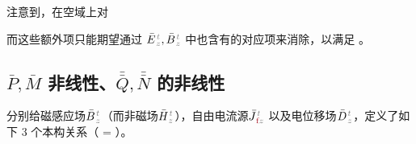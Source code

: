 注意到，在空域上对 

而这些额外项只能期望通过 $\bar{E}^{\;\!\mathcolor{gray}{t}}_{\;\!\mathcolor{gray}{z}},\bar{B}^{\;\!\mathcolor{gray}{t}}_{\;\!\mathcolor{gray}{z}}$ 中也含有的对应项来消除，以满足 。




\subsection{$\bar{P},\bar{M}$ 非线性、$\bar{\bar{Q}},\bar{\bar{N}}$ 的非线性}\label{ssec:PMQN-nonlinear}

分别给磁感应场$\bar{B}^{\;\!\mathcolor{gray}{t}}_{\;\!\mathcolor{gray}{z}}$（而非磁场$\bar{H}^{\;\!\mathcolor{gray}{t}}_{\;\!\mathcolor{gray}{z}}$），自由电流源$\bar{J}^{\;\!\mathcolor{gray}{t}}_{\;\!\textcolor{Maroon}{\text{f}}\mathcolor{gray}{z}}$ 以及电位移场$\bar{D}^{\;\!\mathcolor{gray}{t}}_{\;\!\mathcolor{gray}{z}}$，定义了如下 3 个本构关系（\textcolor{Maroon}{} = \textcolor{Maroon}{}）。

